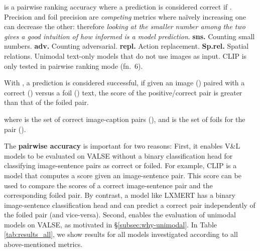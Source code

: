 \documentclass[11pt]{article}
\newcommand{\dataset}{VALSE}
\begin{document}
\begin{table*}[t!]
{     is a pairwise ranking accuracy where a prediction is considered correct if .
    Precision  and foil precision  are \emph{competing} metrics where na\"{i}vely increasing one can decrease the other: therefore \emph{looking at the smaller number among the two gives a good intuition of how informed is a model prediction}.
    {\bf sns.} Counting small numbers. {\bf adv.} Counting adversarial. {\bf repl.} Action replacement.  {\bf Sp.rel.} Spatial relations. Unimodal text-only models that do not use images as input. CLIP is only tested in pairwise ranking mode (fn.\ 6).
}
    \label{tab:results_all}
\end{table*} 
With , a prediction is considered successful, if given an image () paired with a correct () versus a foil () text, the score of the positive/correct pair is greater than that of the foiled pair.

\noindent
where  is the set of correct image-caption pairs (), and  is the set of foils for the pair ().

The \textbf{pairwise accuracy}  is important for two reasons: First, it enables V\&L models to be evaluated on \dataset{} without a binary classification head for classifying image-sentence pairs as correct or foiled. For example, CLIP \cite{radford2021learning} is a model that computes a score given an image-sentence pair. This score can be used to compare the scores of a correct image-sentence pair and the corresponding foiled pair.
By contrast, a model like LXMERT \cite{tan-bansal-2019-lxmert} has a binary image-sentence classification head and can predict a correct pair independently of the foiled pair (and vice-versa). Second,  enables the evaluation of unimodal models on \dataset{}, as motivated 
in \S \ref{subsec:why-unimodal}.
In Table \ref{tab:results_all}, we show results for all models investigated according to all above-mentioned metrics.
\end{document}
